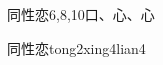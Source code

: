 \begin{entry}{同性恋}{6,8,10}{⼝、⼼、⼼}
  \begin{phonetics}{同性恋}{tong2xing4lian4}
  \end{phonetics}
\end{entry}
